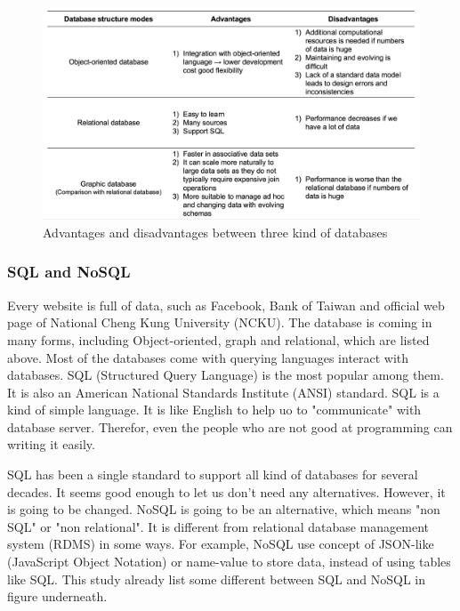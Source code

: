 \begin{figure}[tbh]
	\begin{center}
		\includegraphics[width=\columnwidth]{Wolverine_Method_Chart_2}
	\end{center}
	\caption{Advantages and disadvantages between three kind of databases}
\end{figure}

\subsubsection{SQL and NoSQL}
Every website is full of data, such as Facebook, Bank of Taiwan and official web page of National Cheng Kung University (NCKU).
The database is coming in many forms, including Object-oriented, graph and relational, which are listed above.
Most of the databases come with querying languages interact with databases.
SQL (Structured Query Language) is the most popular among them. 
It is also an American National Standards Institute (ANSI) standard.
SQL is a kind of simple language.
It is like English to help uo to "communicate" with database server.
Therefor, even the people who are not good at programming can writing it easily.

SQL has been a single standard to support all kind of databases for several decades.
It seems good enough to let us don't need any alternatives.
However, it is going to be changed.
NoSQL is going to be an alternative, which means "non SQL" or "non relational". 
It is different from relational database management system (RDMS) in some ways.
For example, NoSQL use concept of JSON-like (JavaScript Object Notation) or name-value to store data, instead of using tables like SQL. This study already list some different between SQL and NoSQL in figure underneath.

